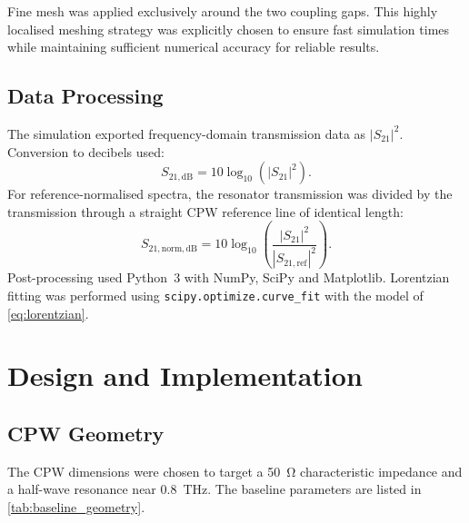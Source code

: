 \documentclass[12pt,a4paper]{article}
\begin{document}
Fine mesh was applied exclusively around the two coupling gaps. This highly localised meshing strategy was explicitly chosen to ensure fast simulation times while maintaining sufficient numerical accuracy for reliable results.

\subsection{Data Processing}

The simulation exported frequency-domain transmission data as $|S_{21}|^2$.
Conversion to decibels used:
\begin{equation}
    S_{21,\mathrm{dB}} = 10\log_{10}(|S_{21}|^2).
    \label{eq:dB}
\end{equation}
For reference-normalised spectra, the resonator transmission was divided
by the transmission through a straight CPW reference line of identical
length:
\begin{equation}
    S_{21,\mathrm{norm,dB}} =
    10\log_{10}\!\left(\frac{|S_{21}|^2}{|S_{21,\mathrm{ref}}|^2}\right).
    \label{eq:norm}
\end{equation}
Post-processing used Python~3 with NumPy, SciPy and Matplotlib.
Lorentzian fitting was performed using \texttt{scipy.optimize.curve\_fit}
with the model of \cref{eq:lorentzian}.

\newpage
\section{Design and Implementation}
\label{sec:design}

\subsection{CPW Geometry}

The CPW dimensions were chosen to target a \SI{50}{\ohm} characteristic
impedance and a half-wave resonance near \SI{0.8}{\tera\hertz}. The
baseline parameters are listed in \cref{tab:baseline_geometry}.
\end{document}
